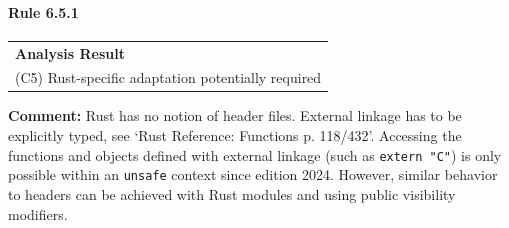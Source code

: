 \paragraph{Rule 6.5.1}
\begin{longtable}{p{13cm}}
\textbf{Analysis Result} \\
(C5) Rust-specific adaptation potentially required \\
\end{longtable}
\textbf{Comment:} Rust has no notion of header files. External linkage has to be explicitly typed, see `Rust Reference: Functions p. 118/432'. Accessing the functions and objects defined with external linkage (such as \texttt{extern "C"}) is only possible within an \texttt{unsafe} context since edition 2024. However, similar behavior to headers can be achieved with Rust modules and using public visibility modifiers. \\


